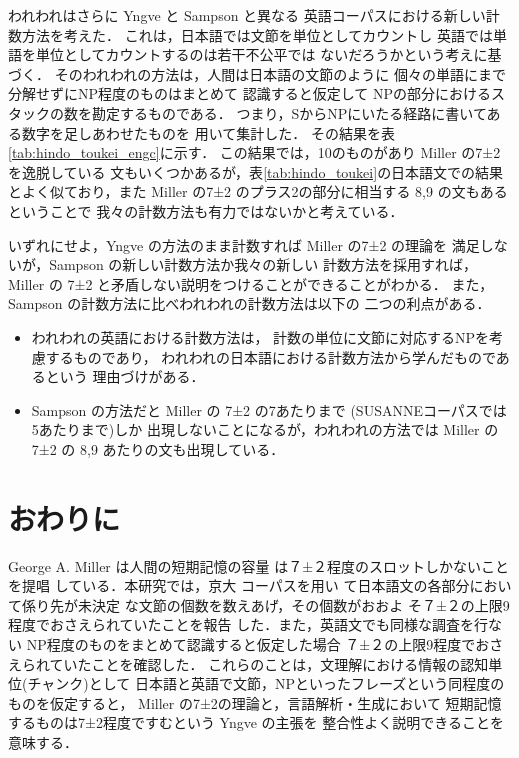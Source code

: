 われわれはさらに Yngve と Sampson と異なる
英語コーパスにおける新しい計数方法を考えた．
これは，日本語では文節を単位としてカウントし
英語では単語を単位としてカウントするのは若干不公平では
ないだろうかという考えに基づく．
そのわれわれの方法は，人間は日本語の文節のように
個々の単語にまで分解せずにNP程度のものはまとめて
認識すると仮定して
NPの部分におけるスタックの数を勘定するものである．
つまり，SからNPにいたる経路に書いてある数字を足しあわせたものを
用いて集計した．
その結果を表\ref{tab:hindo_toukei_engc}に示す．
この結果では，10のものがあり Miller の7±2を逸脱している
文もいくつかあるが，表\ref{tab:hindo_toukei}の日本語文での結果
とよく似ており，また Miller の7±2 のプラス2の部分に相当する
 8,9 の文もあるということで
我々の計数方法も有力ではないかと考えている．

いずれにせよ，Yngve の方法のまま計数すれば Miller の7±2 の理論を
満足しないが，Sampson の新しい計数方法か我々の新しい
計数方法を採用すれば，
Miller の 7±2 と矛盾しない説明をつけることができることがわかる．
また，Sampson の計数方法に比べわれわれの計数方法は以下の
二つの利点がある．
\begin{itemize}
\item 
われわれの英語における計数方法は，
計数の単位に文節に対応するNPを考慮するものであり，
われわれの日本語における計数方法から学んだものであるという
理由づけがある．

\item 
Sampson の方法だと Miller の 7±2 の7あたりまで
(SUSANNEコーパスでは5あたりまで)しか
出現しないことになるが，われわれの方法では
Miller の7±2 の 8,9 あたりの文も出現している．

\end{itemize}
\vspace{-1.5mm}
\section{おわりに}

 George A. Miller は人間の短期記憶の容量
は７±２程度のスロットしかないことを提唱
している\cite{miller56}．本研究では，京大
コーパス\cite{kurohashi_nlp97}を用い
て日本語文の各部分において係り先が未決定
な文節の個数を数えあげ，その個数がおおよ
そ７±２の上限9程度でおさえられていたことを報告
した．また，英語文でも同様な調査を行ない
NP程度のものをまとめて認識すると仮定した場合
７±２の上限9程度でおさえられていたことを確認した．
これらのことは，文理解における情報の認知単位(チャンク)として
日本語と英語で文節，NPといったフレーズという同程度のものを仮定すると，
Miller の7±2の理論と，言語解析・生成において
短期記憶するものは7±2程度ですむという Yngve の主張を
整合性よく説明できることを意味する．

